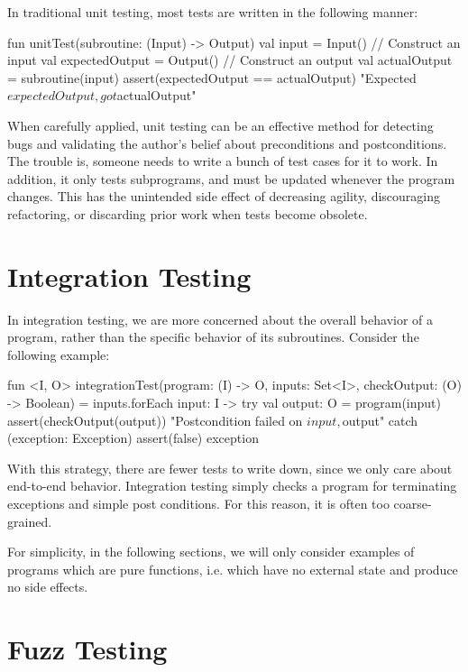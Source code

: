 \noindent In traditional unit testing, most tests are written in the following manner:
%
\begin{kotlinlisting}
fun unitTest(subroutine: (Input) -> Output) {
    val input = Input() // Construct an input
    val expectedOutput = Output() // Construct an output
    val actualOutput = subroutine(input)
    assert(expectedOutput == actualOutput) { "Expected $expectedOutput, got $actualOutput"}
}
\end{kotlinlisting}
%
When carefully applied, unit testing can be an effective method for detecting bugs and validating the author's belief about preconditions and postconditions. The trouble is, someone needs to write a bunch of test cases for it to work. In addition, it only tests subprograms, and must be updated whenever the program changes. This has the unintended side effect of decreasing agility, discouraging refactoring, or discarding prior work when tests become obsolete.

\section{Integration Testing}

\noindent In integration testing, we are more concerned about the overall behavior of a program, rather than the specific behavior of its subroutines. Consider the following example:

\begin{kotlinlisting}
fun <I, O> integrationTest(program: (I) -> O, inputs: Set<I>, checkOutput: (O) -> Boolean) =
    inputs.forEach { input: I ->
        try {
            val output: O = program(input)
            assert(checkOutput(output)) { "Postcondition failed on $input, $output" }
        } catch (exception: Exception) {
            assert(false) { exception }
        }
    }
\end{kotlinlisting}
%
With this strategy, there are fewer tests to write down, since we only care about end-to-end behavior. Integration testing simply checks a program for terminating exceptions and simple post conditions. For this reason, it is often too coarse-grained.

For simplicity, in the following sections, we will only consider examples of programs which are pure functions, i.e. which have no external state and produce no side effects.

\section{Fuzz Testing}

